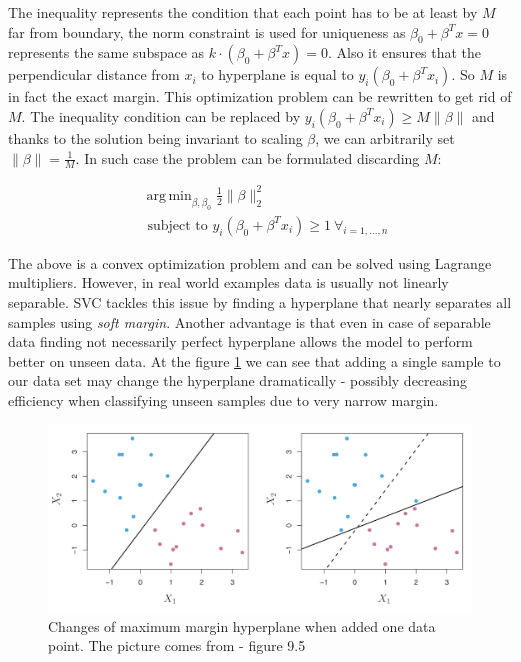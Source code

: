 \documentclass[shortabstract, english, mgr]{iithesis}
\DeclareMathOperator*{\argmin}{arg\,min}
\begin{document}
The inequality represents the condition that each point has to be at least by $M$ far from boundary, the norm constraint is used for uniqueness as $\beta_0 +\beta^Tx = 0$ represents the same subspace as $k\cdot(\beta_0 +\beta^Tx) = 0$. Also it ensures that the perpendicular distance from $x_i$ to hyperplane is equal to $y_i\left(\beta_0 + \beta^Tx_i\right)$. So $M$ is in fact the exact margin. This optimization problem can be rewritten to get rid of $M$. The inequality condition can be replaced by $y_{i}\left(\beta_{0}+\beta^T x_i\right) \geq M\|\beta\|$ and thanks to the solution being invariant to scaling $\beta$, we can arbitrarily set $\|\beta\| = \frac{1}{M}$. In such case the problem can be formulated discarding $M$:

\begin{align*}
& \argmin_{\beta, \beta_0} \frac{1}{2}\|\beta\|^2_2 \\ &{\text { subject to }} {y_{i}\left(\beta_{0}+\beta^T x_i\right) \geq 1 \ \forall_{i=1, \ldots, n}}
\end{align*}

The above is a convex optimization problem and can be solved using Lagrange multipliers. However, in real world examples data is usually not linearly separable. SVC tackles this issue by finding a hyperplane that nearly separates all samples using \textit{soft margin}. Another advantage is that even in case of separable data finding not necessarily perfect hyperplane allows the model to perform better on unseen data. At the figure \ref{fig:svc-robust} we can see that adding a single sample to our data set may change the hyperplane dramatically - possibly decreasing efficiency when classifying unseen samples due to very narrow margin. 

\begin{figure}
\centering
\includegraphics[width=\textwidth]{images/svc-robust.png}
\caption{Changes of maximum margin hyperplane when added one data point. The picture comes from \cite{ISL} - figure 9.5}
\label{fig:svc-robust}
\end{figure}
\end{document}
